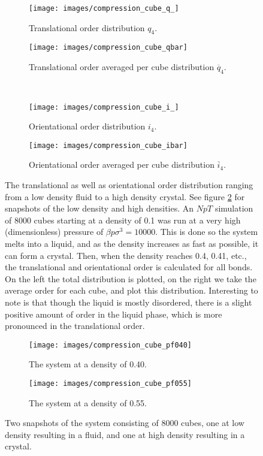 \documentclass[thesis]{subfiles}
\begin{document}
\begin{figure}[h]
	\centering
	\begin{subfigure}{0.48\textwidth}
		\centering
		\texttt{[image: images/compression\_cube\_q\_]}
		\caption{Translational order distribution $q_4$.}
	\end{subfigure}
	\begin{subfigure}{0.51\textwidth}
		\centering
		\texttt{[image: images/compression\_cube\_qbar]}
		\caption{Translational order averaged per cube distribution $\overline q_4$.}
	\end{subfigure}\\\vspace{10pt}
	\begin{subfigure}{0.48\textwidth}
		\centering
		\texttt{[image: images/compression\_cube\_i\_]}
		\caption{Orientational order distribution $i_4$.}
	\end{subfigure}
	\begin{subfigure}{0.51\textwidth}
		\centering
		\texttt{[image: images/compression\_cube\_ibar]}
		\caption{Orientational order averaged per cube distribution $\overline i_4$.}
	\end{subfigure}
	\caption{The translational as well as orientational order distribution ranging from a low density fluid to a high density crystal. See figure \ref{fig:compression_cube_snapshots} for snapshots of the low density and high densities. An $NpT$ simulation of 8000 cubes starting at a density of 0.1 was run at a very high (dimensionless) pressure of $\beta p \sigma^3 = 10000$. This is done so the system melts into a liquid, and as the density increases as fast as possible, it can form a crystal. Then, when the density reaches 0.4, 0.41, etc., the translational and orientational order is calculated for all bonds. On the left the total distribution is plotted, on the right we take the average order for each cube, and plot this distribution.  Interesting to note is that though the liquid is mostly disordered, there is a slight positive amount of order in the liquid phase, which is more pronounced in the translational order.}
	\label{fig:compression_cube}
\end{figure}

\begin{figure}[h]
	{\centering
		\hfill
		\begin{subfigure}{0.4\textwidth}
			\centering
			\texttt{[image: images/compression\_cube\_pf040]}
			\caption{The system at a density of 0.40.}
		\end{subfigure}\hfill
		\begin{subfigure}{0.4\textwidth}
			\centering
			\texttt{[image: images/compression\_cube\_pf055]}
			\caption{The system at a density of 0.55.}
		\end{subfigure}
		\hfill}
	\caption{Two snapshots of the system consisting of 8000 cubes, one at low density resulting in a fluid, and one at high density resulting in a crystal.}
	\label{fig:compression_cube_snapshots}
\end{figure}
\end{document}
